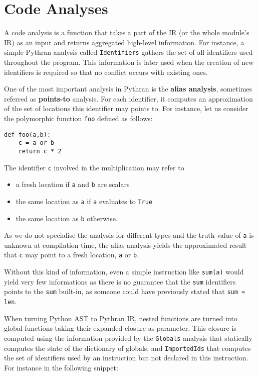 \documentclass[10pt, onecolumn, preprint]{sigplanconf}
\begin{document}
\section{Code Analyses}
\label{sec:analysis}

A code analysis is a function that takes a part of the IR (or the whole
module's IR) as an input and returns aggregated high-level information. For
instance, a simple Pythran analysis called \texttt{Identifiers} gathers the set
of all identifiers used throughout the program. This information is later used
when the creation of new identifiers is required so that no conflict occurs
with existing ones.

One of the most important analysis in Pythran is the \textbf{alias analysis}, sometimes
referred as \textbf{points-to} analysis. For each identifier, it computes an
approximation of the set of locations this identifier may points to. For
instance, let us consider the polymorphic function \texttt{foo} defined as follows:

\begin{lstlisting}
def foo(a,b):
    c = a or b
    return c * 2
\end{lstlisting}

The identifier \texttt{c} involved in the multiplication may refer to

\begin{itemize}
    \item a fresh location if \texttt{a} and \texttt{b} are scalars

    \item the same location as \texttt{a} if \texttt{a} evaluates to \texttt{True}

    \item the same location as \texttt{b} otherwise.

\end{itemize}

As we do not specialise the analysis for different types and the truth value of
\texttt{a} is unknown at compilation time, the alias analysis yields the approximated
result that \texttt{c} may point to a fresh location, \texttt{a} or \texttt{b}.

Without this kind of information, even a simple instruction like
\texttt{sum(a)} would yield very few informations as there is no guarantee that
the \texttt{sum} identifiers points to the \texttt{sum} built-in, as someone
could have previously stated that \texttt{sum = len}.

When turning Python AST to Pythran IR, nested functions are turned into global
functions taking their expanded closure as parameter. This closure is computed using the
information provided by the \texttt{Globals} analysis that statically computes the
state of the dictionary of globals, and \texttt{ImportedIds} that computes the set of
identifiers used by an instruction but not declared in this instruction. For
instance in the following snippet:
\end{document}
